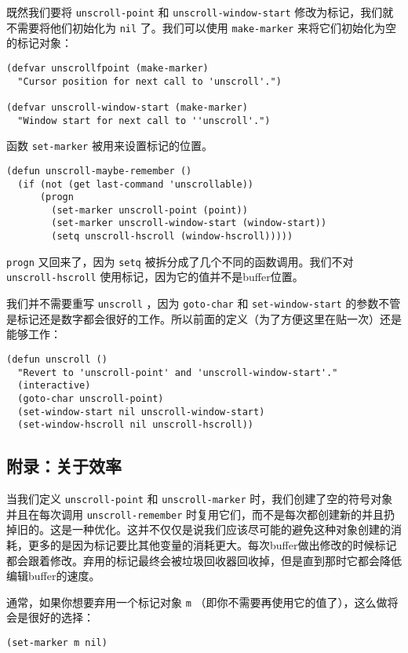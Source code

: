 既然我们要将 \texttt{unscroll-point} 和 \texttt{unscroll-window-start} 修改为标记，我们就不需要将他们初始化为 \texttt{nil} 了。我们可以使用 \texttt{make-marker} 来将它们初始化为空的标记对象：

\begin{verbatim}
(defvar unscrollfpoint (make-marker)
  "Cursor position for next call to 'unscroll'.")
  
(defvar unscroll-window-start (make-marker)
  "Window start for next call to ''unscroll'.")
\end{verbatim}

函数 \texttt{set-marker} 被用来设置标记的位置。

\begin{verbatim}
(defun unscroll-maybe-remember ()
  (if (not (get last-command 'unscrollable))
      (progn
        (set-marker unscroll-point (point))
        (set-marker unscroll-window-start (window-start))
        (setq unscroll-hscroll (window-hscroll)))))
\end{verbatim}

\texttt{progn} 又回来了，因为 \texttt{setq} 被拆分成了几个不同的函数调用。我们不对 \texttt{unscroll-hscroll} 使用标记，因为它的值并不是buffer位置。

我们并不需要重写 \texttt{unscroll} ，因为 \texttt{goto-char} 和 \texttt{set-window-start} 的参数不管是标记还是数字都会很好的工作。所以前面的定义（为了方便这里在贴一次）还是能够工作：

\begin{verbatim}
(defun unscroll ()
  "Revert to 'unscroll-point' and 'unscroll-window-start'."
  (interactive)
  (goto-char unscroll-point)
  (set-window-start nil unscroll-window-start)
  (set-window-hscroll nil unscroll-hscroll))
\end{verbatim}

\subsection{附录：关于效率}
\label{section:03-Addendum-Efficiency-Consideration}

当我们定义 \texttt{unscroll-point} 和 \texttt{unscroll-marker} 时，我们创建了空的符号对象并且在每次调用 \texttt{unscroll-remember} 时复用它们，而不是每次都创建新的并且扔掉旧的。这是一种优化。这并不仅仅是说我们应该尽可能的避免这种对象创建的消耗，更多的是因为标记要比其他变量的消耗更大。每次buffer做出修改的时候标记都会跟着修改。弃用的标记最终会被垃圾回收器回收掉，但是直到那时它都会降低编辑buffer的速度。

通常，如果你想要弃用一个标记对象 \texttt{m} （即你不需要再使用它的值了），这么做将会是很好的选择：

\begin{verbatim}
(set-marker m nil)
\end{verbatim}
